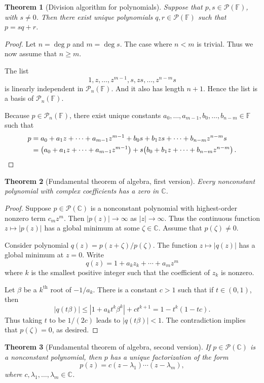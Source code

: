 \documentclass{tufte-handout}
\theoremstyle{plain} %
\newtheorem{thm}{Theorem}
\theoremstyle{definition}
\theoremstyle{remark}
\newcommand{\bra}[1]{\mathopen{}\left(#1\right)}
\newcommand{\C}{\mathbb{C}}
\newcommand{\F}{\mathbb{F}}
\renewcommand{\P}{\mathcal{P}}
\newcommand{\abs}[1]{\left| #1 \right|}
\begin{document}
\begin{thm}[Division algorithm for polynomials]
	Suppose that $p,s\in\P(\F)$, with $s\neq0$. Then there exist unique polynomials $q,r\in\P(\F)$ such that $p=sq+r$.%
\end{thm}
\begin{proof}
	Let $n=\deg p$ and $m=\deg s$. The case where $n<m$ is trivial. Thus we now assume that $n\geq m$.

	The list
	\[1,z,\dots,z^{m-1},s,zs,\dots,z^{n-m}s\]
	is linearly independent in $\P_n(\F)$. And it also has length $n+1$. Hence the list is a basis of $\P_n(\F)$.

	Because $p\in\P_n(\F)$, there exist unique constants $a_0,\dots,a_{m-1},b_0,\dots,b_{n-m}\in\F$ such that
	\begin{align*}
		p&=a_0+a_1z+\cdots+a_{m-1}z^{m-1}+b_0s+b_1zs+\cdots+b_{n-m}z^{n-m}s\\
		&=\bra{a_0+a_1z+\cdots+a_{m-1}z^{m-1}}+s\bra{b_0+b_1z+\cdots+b_{n-m}z^{n-m}}.\qedhere
	\end{align*}
\end{proof}

\begin{thm}[Fundamental theorem of algebra, first version]
	Every nonconstant polynomial with complex coefficients has a zero in $\C$.
\end{thm}
\begin{proof}
	Suppose $p\in\P(\C)$ is a nonconstant polynomial with highest-order nonzero term $c_mz^m$. Then $\abs{p(z)}\to\infty$ as $\abs{z}\to\infty$. Thus the continuous function $z\mapsto\abs{p(z)}$ has a global minimum at some $\zeta\in\C$. Assume that $p(\zeta)\neq0$.

	Consider polynomial $q(z)=p(z+\zeta)/p(\zeta)$. The function $z\mapsto\abs{q(z)}$ has a global minimum at $z=0$. Write
	\[q(z)=1+a_kz_k+\cdots+a_mz^m\]
	where $k$ is the smallest positive integer such that the coefficient of $z_k$ is nonzero.
	
	Let $\beta$ be a $k^\text{th}$ root of $-1/a_k$. There is a constant $c>1$ such that if $t\in(0,1)$, then
	\[\abs{q(t\beta)}\leq\abs{1+a_kt^k\beta^k}+ct^{k+1}=1-t^k(1-tc).\]
	Thus taking $t$ to be $1/(2c)$ leads to $\abs{q(t\beta)}<1$. The contradiction implies that $p(\zeta)=0$, as desired.
\end{proof}

\begin{thm}[Fundamental theorem of algebra, second version]
	If $p\in\P(\C)$ is a nonconstant polynomial, then $p$ has a unique factorization of the form
	\[p(z)=c(z-\lambda_1)\cdots(z-\lambda_m),\]
	where $c,\lambda_1,\dots,\lambda_m\in\C$.
\end{thm}
\end{document}

